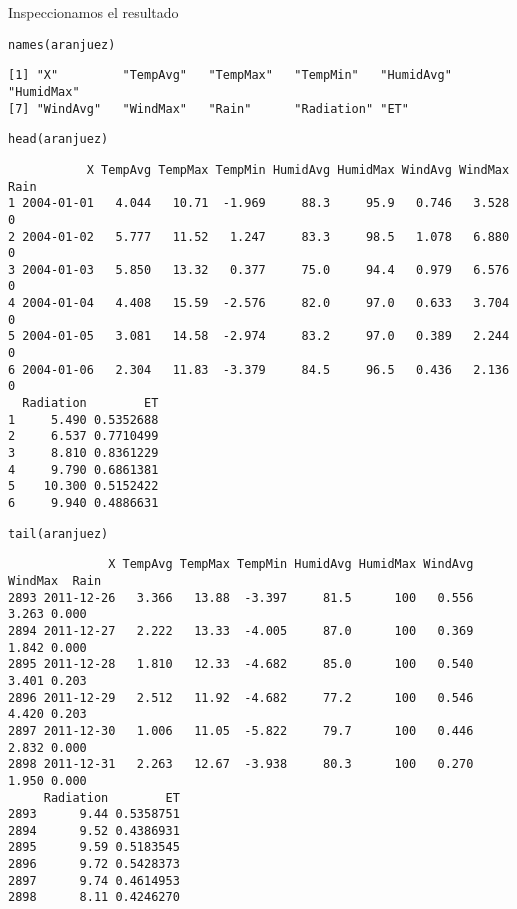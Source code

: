 \documentclass[xcolor={usenames,svgnames,dvipsnames}]{beamer}
\begin{document}
\begin{frame}[label={sec:org5ab7b45},fragile]{Inspeccionamos el resultado}
 \lstset{language=r,label= ,caption= ,captionpos=b,numbers=none}
\begin{lstlisting}
names(aranjuez)
\end{lstlisting}

\begin{verbatim}
[1] "X"         "TempAvg"   "TempMax"   "TempMin"   "HumidAvg"  "HumidMax" 
[7] "WindAvg"   "WindMax"   "Rain"      "Radiation" "ET"
\end{verbatim}


\lstset{language=r,label= ,caption= ,captionpos=b,numbers=none}
\begin{lstlisting}
head(aranjuez)
\end{lstlisting}

\begin{verbatim}
           X TempAvg TempMax TempMin HumidAvg HumidMax WindAvg WindMax Rain
1 2004-01-01   4.044   10.71  -1.969     88.3     95.9   0.746   3.528    0
2 2004-01-02   5.777   11.52   1.247     83.3     98.5   1.078   6.880    0
3 2004-01-03   5.850   13.32   0.377     75.0     94.4   0.979   6.576    0
4 2004-01-04   4.408   15.59  -2.576     82.0     97.0   0.633   3.704    0
5 2004-01-05   3.081   14.58  -2.974     83.2     97.0   0.389   2.244    0
6 2004-01-06   2.304   11.83  -3.379     84.5     96.5   0.436   2.136    0
  Radiation        ET
1     5.490 0.5352688
2     6.537 0.7710499
3     8.810 0.8361229
4     9.790 0.6861381
5    10.300 0.5152422
6     9.940 0.4886631
\end{verbatim}

\lstset{language=r,label= ,caption= ,captionpos=b,numbers=none}
\begin{lstlisting}
tail(aranjuez)
\end{lstlisting}

\begin{verbatim}
              X TempAvg TempMax TempMin HumidAvg HumidMax WindAvg WindMax  Rain
2893 2011-12-26   3.366   13.88  -3.397     81.5      100   0.556   3.263 0.000
2894 2011-12-27   2.222   13.33  -4.005     87.0      100   0.369   1.842 0.000
2895 2011-12-28   1.810   12.33  -4.682     85.0      100   0.540   3.401 0.203
2896 2011-12-29   2.512   11.92  -4.682     77.2      100   0.546   4.420 0.203
2897 2011-12-30   1.006   11.05  -5.822     79.7      100   0.446   2.832 0.000
2898 2011-12-31   2.263   12.67  -3.938     80.3      100   0.270   1.950 0.000
     Radiation        ET
2893      9.44 0.5358751
2894      9.52 0.4386931
2895      9.59 0.5183545
2896      9.72 0.5428373
2897      9.74 0.4614953
2898      8.11 0.4246270
\end{verbatim}
\end{frame}
\end{document}
